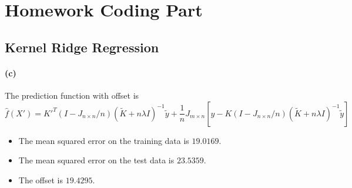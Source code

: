 \documentclass[12pt]{article}
\begin{document}

\setcounter{section}{3}
\section{Homework Coding Part}
\setcounter{subsection}{1}
\subsection{Kernel Ridge Regression}
\paragraph{(c)}
The prediction function with offset is
\[ \hat{f}(X')=K'^{T}\left(I-J_{n\times n}/n\right)(\tilde{K}+n\lambda I)^{-1}\tilde{y}+\frac{1}{n}J_{m\times n}\left[y-K(I-J_{n\times n}/n)(\tilde{K}+n\lambda I)^{-1}\tilde{y} \right] \]
\begin{itemize}
    \item The mean squared error on the training data is \(19.0169\).
    \item The mean squared error on the test data is \(23.5359\).
    \item The offset is \(19.4295\).
\end{itemize}
\end{document}
